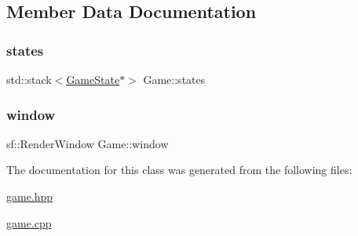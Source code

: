 \subsection{Member Data Documentation}
\mbox{\label{class_game_afb615f4fb6621cd14769c14716f4b0a5}} 
\subsubsection{\texorpdfstring{states}{states}}
{\footnotesize\ttfamily std\+::stack$<$\hyperlink{class_game_state}{Game\+State}$\ast$$>$ Game\+::states}

\mbox{\label{class_game_a223de215aeb661cd423ac145756cc730}} 
\subsubsection{\texorpdfstring{window}{window}}
{\footnotesize\ttfamily sf\+::\+Render\+Window Game\+::window}



The documentation for this class was generated from the following files\+:\begin{DoxyCompactItemize}
\item 
\hyperlink{game_8hpp}{game.\+hpp}\item 
\hyperlink{game_8cpp}{game.\+cpp}\end{DoxyCompactItemize}
